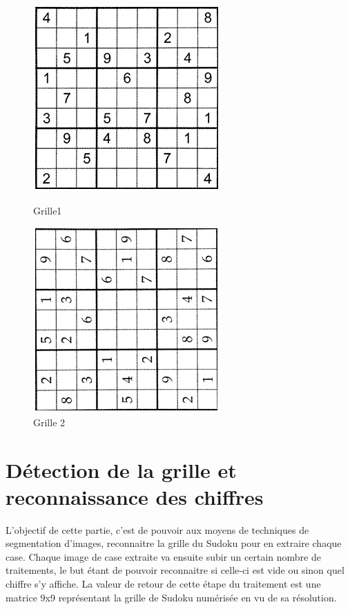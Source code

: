 \documentclass[12pt]{article}
\begin{document}
\begin{figure}[!h]
\centering
\begin{minipage}{.5\textwidth}
  \centering
  \includegraphics[scale = 0.8]{b7.png}
  \caption{\label{b7} Grille1 }
\end{minipage}%
\begin{minipage}{.5\textwidth}
  \centering
  \includegraphics[scale = 0.8]{b8.png}
  \caption{\label{b8} Grille 2}
\end{minipage}
\end{figure}

\section{Détection de la grille et reconnaissance des chiffres}

L'objectif de cette partie, c'est de pouvoir aux moyens de techniques de segmentation d'images, reconnaitre la grille du Sudoku pour en extraire chaque case. Chaque image de case extraite va ensuite subir un certain nombre de traitements, le but étant de pouvoir reconnaitre si celle-ci est vide ou sinon quel chiffre s'y affiche. La valeur de retour de cette étape du traitement est une matrice 9x9 représentant la grille de Sudoku numérisée en vu de sa résolution.
\end{document}
